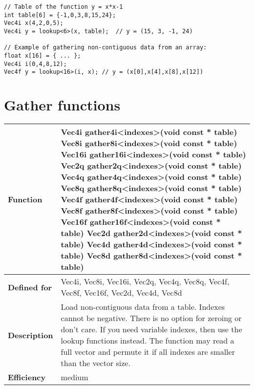 \documentclass[vcl_manual.tex]{subfiles}
\begin{document}
\begin{lstlisting}[frame=none]
// Table of the function y = x*x-1
int table[6] = {-1,0,3,8,15,24};
Vec4i x(4,2,0,5);
Vec4i y = lookup<6>(x, table);  // y = (15, 3, -1, 24)

// Example of gathering non-contiguous data from an array:
float x[16] = { ... };
Vec4i i(0,4,8,12);
Vec4f y = lookup<16>(i, x); // y = (x[0],x[4],x[8],x[12])
\end{lstlisting}


\section{Gather functions}\label{GatherFunctions}

\begin{tabular}{|p{30mm}|p{120mm}|} \hline
\bfseries Function & 
Vec4i gather4i\textless indexes\textgreater(void const * table) \newline
Vec8i gather8i\textless indexes\textgreater(void const * table) \newline
Vec16i gather16i\textless indexes\textgreater(void const * table) \newline
Vec2q gather2q\textless indexes\textgreater(void const * table) \newline
Vec4q gather4q\textless indexes\textgreater(void const * table) \newline
Vec8q gather8q\textless indexes\textgreater(void const * table) \newline
Vec4f gather4f\textless indexes\textgreater(void const * table) \newline
Vec8f gather8f\textless indexes\textgreater(void const * table) \newline
Vec16f gather16f\textless indexes\textgreater(void const * table) \newline
Vec2d gather2d\textless indexes\textgreater(void const * table) \newline
Vec4d gather4d\textless indexes\textgreater(void const * table) \newline
Vec8d gather8d\textless indexes\textgreater(void const * table) \\ \hline
\bfseries Defined for & Vec4i, Vec8i, Vec16i, Vec2q, Vec4q, Vec8q, \newline
Vec4f, Vec8f, Vec16f, Vec2d, Vec4d, Vec8d \\ \hline
\bfseries Description & Load non-contiguous data from a table. Indexes cannot be negative. There is no option for zeroing or don't care.  \newline
If you need variable indexes, then use the lookup functions instead. \newline
The function may read a full vector and permute it if all indexes are smaller than the vector size.  \\ \hline
\bfseries Efficiency & medium \\ \hline
\end{tabular}
\end{document}
